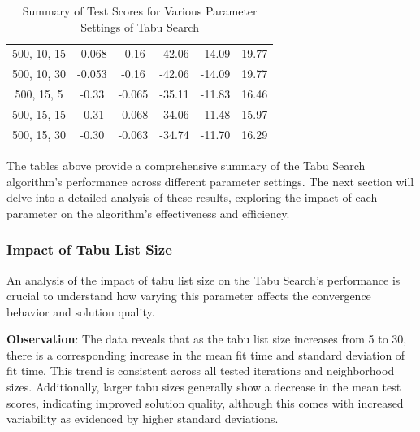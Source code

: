 \documentclass{article}
\begin{document}
\begin{table}[H]
{\begin{tabular}{|c|c|c|c|c|c|}
                500, 10, 15                & -0.068                     & -0.16                      & -42.06                     & -14.09                   & 19.77                   \\
                500, 10, 30                & -0.053                     & -0.16                      & -42.06                     & -14.09                   & 19.77                   \\
                500, 15, 5                 & -0.33                      & -0.065                     & -35.11                     & -11.83                   & 16.46                   \\
                500, 15, 15                & -0.31                      & -0.068                     & -34.06                     & -11.48                   & 15.97                   \\
                500, 15, 30                & -0.30                      & -0.063                     & -34.74                     & -11.70                   & 16.29                   \\
                \hline
            \end{tabular}
        }
        \caption{Summary of Test Scores for Various Parameter Settings of Tabu Search}
        \label{tab:ts_summary_test_scores}
    \end{table}

    The tables above provide a comprehensive summary of the Tabu Search algorithm's performance across different parameter settings. The next section will delve into a detailed analysis of these results, exploring the impact of each parameter on the algorithm's effectiveness and efficiency.

    \subsubsection{Impact of Tabu List Size}

    An analysis of the impact of tabu list size on the Tabu Search's performance is crucial to understand how varying this parameter affects the convergence behavior and solution quality.

    \textbf{Observation}: The data reveals that as the tabu list size increases from 5 to 30, there is a corresponding increase in the mean fit time and standard deviation of fit time. This trend is consistent across all tested iterations and neighborhood sizes. Additionally, larger tabu sizes generally show a decrease in the mean test scores, indicating improved solution quality, although this comes with increased variability as evidenced by higher standard deviations.
\end{document}
